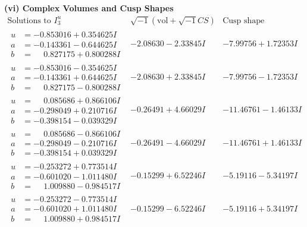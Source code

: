 \documentclass[1p]{elsarticle_modified}
\theoremstyle{definition}
\newcommand{\I}{\sqrt{-1}}
\begin{document}
\newpage\flushleft \textbf{(vi) Complex Volumes and Cusp Shapes}
$$\begin{array}{c|c|c}  
\text{Solutions to }I^u_{3}& \I (\text{vol} + \sqrt{-1}CS) & \text{Cusp shape}\\
 \hline 
\begin{aligned}
u &= -0.853016 + 0.354625 I \\
a &= -0.143361 - 0.644625 I \\
b &= \phantom{-}0.827175 + 0.800288 I\end{aligned}
 & -2.08630 - 2.33845 I & -7.99756 + 1.72353 I \\ \hline\begin{aligned}
u &= -0.853016 - 0.354625 I \\
a &= -0.143361 + 0.644625 I \\
b &= \phantom{-}0.827175 - 0.800288 I\end{aligned}
 & -2.08630 + 2.33845 I & -7.99756 - 1.72353 I \\ \hline\begin{aligned}
u &= \phantom{-}0.085686 + 0.866106 I \\
a &= -0.298049 + 0.210716 I \\
b &= -0.398154 - 0.039329 I\end{aligned}
 & -0.26491 + 4.66029 I & -11.46761 - 1.46133 I \\ \hline\begin{aligned}
u &= \phantom{-}0.085686 - 0.866106 I \\
a &= -0.298049 - 0.210716 I \\
b &= -0.398154 + 0.039329 I\end{aligned}
 & -0.26491 - 4.66029 I & -11.46761 + 1.46133 I \\ \hline\begin{aligned}
u &= -0.253272 + 0.773514 I \\
a &= -0.601020 - 1.011480 I \\
b &= \phantom{-}1.009880 - 0.984517 I\end{aligned}
 & -0.15299 + 6.52246 I & -5.19116 - 5.34197 I \\ \hline\begin{aligned}
u &= -0.253272 - 0.773514 I \\
a &= -0.601020 + 1.011480 I \\
b &= \phantom{-}1.009880 + 0.984517 I\end{aligned}
 & -0.15299 - 6.52246 I & -5.19116 + 5.34197 I \\ \hline\begin{aligned}

\end{aligned}
\end{array}$$
\end{document}

